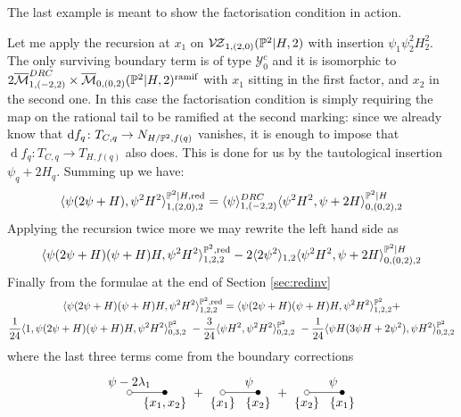 The last example is meant to show the factorisation condition in action.
\begin{ex}
 Let me apply the recursion at $x_1$ on $\mathcal{V\!Z}_{1,(2,0)}(\mathbb P^2|H,2)$ with insertion $\psi_1\psi_2^2H_2^2$. The only surviving boundary term is of type $\mathcal Y^c_0$ and it is isomorphic to $2\overline{\mathcal{M}}^{DRC}_{1,(-2,2)}\times\overline{\mathcal{M}}_{0,(0,2)}(\mathbb P^2|H,2)^{\rm{ramif}}$ with $x_1$ sitting in the first factor, and $x_2$ in the second one. In this case the factorisation condition is simply requiring the map on the rational tail to be ramified at the second marking: since we already know that $\operatorname{d}\! f_q\colon T_{C,q}\rightarrow N_{H/\mathbb P^2,f(q)}$ vanishes, it is enough to impose that $\operatorname{d}\! f_q\colon T_{C,q}\to T_{H,f(q)}$ also does. This is done for us by the tautological insertion $\psi_q+2H_q$. Summing up we have:
 \[\langle\psi(2\psi+H),\psi^2H^2\rangle^{\mathbb P^2|H,\rm{red}}_{1,(2,0),2}=\langle\psi\rangle^{DRC}_{1,(-2,2)}\langle\psi^2H^2,\psi+2H\rangle^{\mathbb P^2|H}_{0,(0,2),2}\]
 Applying the recursion twice more we may rewrite the left hand side as
 \[\langle\psi(2\psi+H)(\psi+H)H,\psi^2H^2\rangle^{\mathbb P^2,\rm{red}}_{1,2,2}-2\langle2\psi^2\rangle_{1,2}\langle\psi^2H^2,\psi+2H\rangle^{\mathbb P^2|H}_{0,(0,2),2}\]
 Finally from the formulae at the end of Section \ref{sec:redinv}
\begin{multline*}
 \langle\psi(2\psi+H)(\psi+H)H,\psi^2H^2\rangle^{\PP^2,\rm{red}}_{1,2,2}=\langle\psi(2\psi+H)(\psi+H)H,\psi^2H^2\rangle^{\PP^2}_{1,2,2}+\\ \frac{1}{24}\langle1,\psi(2\psi+H)(\psi+H)H,\psi^2H^2\rangle^{\PP^2}_{0,3,2}\ -\frac{3}{24}\langle\psi H^2,\psi^2H^2\rangle^{\PP^2}_{0,2,2}\ 
 -\frac{1}{24}\langle\psi H(3\psi H+2\psi^2),\psi H^2\rangle^{\PP^2}_{0,2,2}
\end{multline*}
where the last three terms come from the boundary corrections \[{\tikz[baseline=-3pt]{
\draw (0,0)node[above]{$\psi-2\lambda_1$} -- (1,0)node[below]{$\{x_1,x_2\}$};
\draw (0,0) circle(2pt)[fill=white];
\fill (1,0) circle (2pt)}
}+ {\tikz[baseline=-3pt]{
\draw (0,0)node[below]{$\{x_1\}$} -- node[above right]{$\psi$}(1,0)node[below]{$\{x_2\}$};
\draw (0,0) circle(2pt)[fill=white];
\fill (1,0) circle (2pt)}
}+ {\tikz[baseline=-3pt]{
\draw (0,0)node[below]{$\{x_2\}$} -- node[above right]{$\psi$}(1,0)node[below]{$\{x_1\}$};
\draw (0,0) circle(2pt)[fill=white];
\fill (1,0) circle (2pt)}
}
\]
\end{ex}
